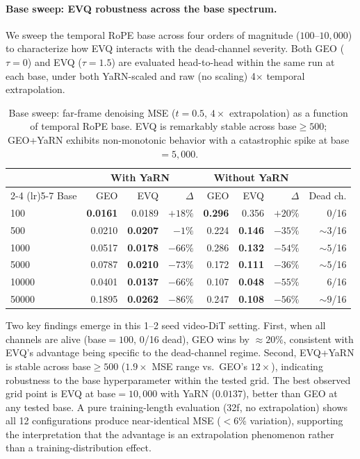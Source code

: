 \paragraph{Base sweep: EVQ robustness across the base spectrum.}
We sweep the temporal RoPE base across four orders of magnitude ($100$--$10{,}000$) to characterize how EVQ interacts with the dead-channel severity. Both GEO ($\tau{=}0$) and EVQ ($\tau{=}1.5$) are evaluated head-to-head within the same run at each base, under both YaRN-scaled and raw (no scaling) 4$\times$ temporal extrapolation.

\begin{table}[ht]
\caption{Base sweep: far-frame denoising MSE ($t{=}0.5$, $4\times$ extrapolation) as a function of temporal RoPE base. EVQ is remarkably stable across base${\geq}500$; GEO+YaRN exhibits non-monotonic behavior with a catastrophic spike at base${}=5{,}000$.}
\centering
\small
\begin{tabular}{@{}l r r r r r r r@{}}
\toprule
& \multicolumn{3}{c}{With YaRN} & \multicolumn{3}{c}{Without YaRN} & \\
\cmidrule(lr){2-4} \cmidrule(lr){5-7}
Base & GEO & EVQ & $\Delta$ & GEO & EVQ & $\Delta$ & Dead ch. \\
\midrule
100 & \textbf{0.0161} & 0.0189 & $+18\%$ & \textbf{0.296} & 0.356 & $+20\%$ & 0/16 \\
500 & 0.0210 & \textbf{0.0207} & $-1\%$ & 0.224 & \textbf{0.146} & $-35\%$ & ${\sim}3$/16 \\
1000 & 0.0517 & \textbf{0.0178} & \cellcolor{green!15}$-66\%$ & 0.286 & \textbf{0.132} & \cellcolor{green!15}$-54\%$ & ${\sim}5$/16 \\
5000 & 0.0787 & \textbf{0.0210} & \cellcolor{green!15}$-73\%$ & 0.172 & \textbf{0.111} & $-36\%$ & ${\sim}5$/16 \\
10000 & 0.0401 & \textbf{0.0137} & \cellcolor{green!15}$-66\%$ & 0.107 & \textbf{0.048} & \cellcolor{green!15}$-55\%$ & 6/16 \\
50000 & 0.1895 & \textbf{0.0262} & \cellcolor{green!15}$-86\%$ & 0.247 & \textbf{0.108} & \cellcolor{green!15}$-56\%$ & ${\sim}9$/16 \\
\bottomrule
\end{tabular}
\end{table}

Two key findings emerge in this 1--2 seed video-DiT setting. First, when all channels are alive (base${}=100$, 0/16 dead), GEO wins by ${\approx}20\%$, consistent with EVQ's advantage being specific to the dead-channel regime. Second, EVQ+YaRN is stable across base${\geq}500$ ($1.9\times$ MSE range vs.\ GEO's $12\times$), indicating robustness to the base hyperparameter within the tested grid. The best observed grid point is EVQ at base${}=10{,}000$ with YaRN ($0.0137$), better than GEO at any tested base. A pure training-length evaluation (32f, no extrapolation) shows all 12 configurations produce near-identical MSE ($<6\%$ variation), supporting the interpretation that the advantage is an extrapolation phenomenon rather than a training-distribution effect.
